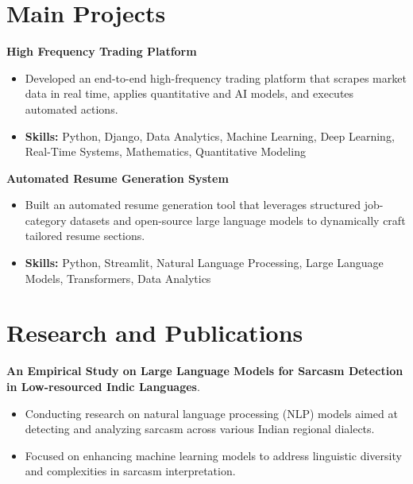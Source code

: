 \documentclass[a4paper,11pt]{article}
\begin{document}
\section{\textbf{Main Projects}}

\vspace{1mm}
  \textbf{High Frequency Trading Platform  }
\vspace{-1.5mm} %
\begin{itemize}
  \item Developed an end-to-end high-frequency trading platform that scrapes market data in real time, applies quantitative and AI models, and executes automated actions.
\vspace{-3mm}
  \item \textbf{Skills:} Python, Django, Data Analytics, Machine Learning, Deep Learning, Real-Time Systems, Mathematics, Quantitative Modeling
\end{itemize}


\vspace{1mm}
   \textbf{Automated Resume Generation System }
\vspace{-1.5mm} %
\begin{itemize}
  \item Built an automated resume generation tool that leverages structured job-category datasets and open-source large language models to dynamically craft tailored resume sections.
\vspace{-3mm}
  \item \textbf{Skills:} Python, Streamlit, Natural Language Processing, Large Language Models, Transformers, Data Analytics
\end{itemize}



\section{\textbf{Research and Publications} \hfill }
\vspace{1mm}
  \textbf{An Empirical Study on Large Language Models for Sarcasm Detection in Low-resourced Indic Languages}.
\vspace{-1mm} %
\begin{itemize}
  \item Conducting research on natural language processing (NLP) models aimed at detecting and analyzing sarcasm across various Indian regional dialects.
\vspace{-3mm}
  \item Focused on enhancing machine learning models to address linguistic diversity and complexities in sarcasm interpretation.
\end{itemize}
\end{document}
